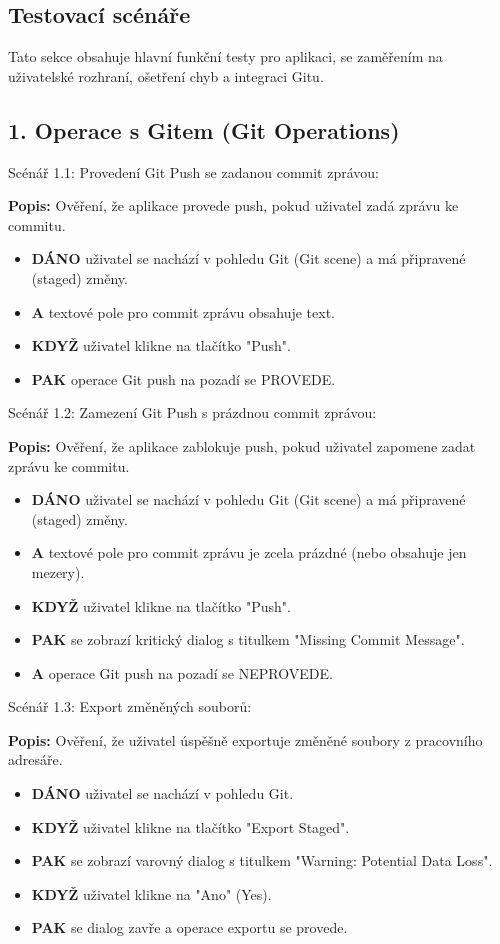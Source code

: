 \documentclass[12pt, a4paper]{article}
\begin{document}
\subsection{Testovací scénáře}

Tato sekce obsahuje hlavní funkční testy pro aplikaci, se zaměřením na uživatelské rozhraní, ošetření chyb a integraci Gitu.

\subsection*{1. Operace s Gitem (Git Operations)}

Scénář 1.1: Provedení Git Push se zadanou commit zprávou:

\textbf{Popis:} Ověření, že aplikace provede push, pokud uživatel zadá zprávu ke commitu.
\begin{itemize}
    \item \textbf{DÁNO} uživatel se nachází v pohledu Git (Git scene) a má připravené (staged) změny.
    \item \textbf{A} textové pole pro commit zprávu obsahuje text.
    \item \textbf{KDYŽ} uživatel klikne na tlačítko "Push".
    \item \textbf{PAK} operace Git push na pozadí se PROVEDE.
\end{itemize}

Scénář 1.2: Zamezení Git Push s prázdnou commit zprávou:

\textbf{Popis:} Ověření, že aplikace zablokuje push, pokud uživatel zapomene zadat zprávu ke commitu.
\begin{itemize}
    \item \textbf{DÁNO} uživatel se nachází v pohledu Git (Git scene) a má připravené (staged) změny.
    \item \textbf{A} textové pole pro commit zprávu je zcela prázdné (nebo obsahuje jen mezery).
    \item \textbf{KDYŽ} uživatel klikne na tlačítko "Push".
    \item \textbf{PAK} se zobrazí kritický dialog s titulkem "Missing Commit Message".
    \item \textbf{A} operace Git push na pozadí se NEPROVEDE.
\end{itemize}

Scénář 1.3: Export změněných souborů:

\textbf{Popis:} Ověření, že uživatel úspěšně exportuje změněné soubory z pracovního adresáře.
\begin{itemize}
    \item \textbf{DÁNO} uživatel se nachází v pohledu Git.
    \item \textbf{KDYŽ} uživatel klikne na tlačítko "Export Staged".
    \item \textbf{PAK} se zobrazí varovný dialog s titulkem "Warning: Potential Data Loss".
    \item \textbf{KDYŽ} uživatel klikne na "Ano" (Yes).
    \item \textbf{PAK} se dialog zavře a operace exportu se provede.
\end{itemize}
\end{document}
